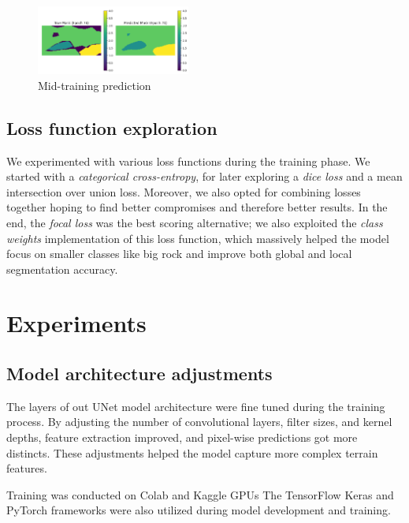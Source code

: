 \documentclass[11pt]{article}
\begin{document}
\begin{multicols}{2}
        \begin{figure}[H]
            \centering
            \includegraphics[width=0.45\textwidth]{reports/images/prediction1.png}
            \caption{\small Mid-training prediction}
        \end{figure}
        
        \subsection{Loss function exploration}
        
        We experimented with various loss functions during the training phase.
        We started with a \textit{categorical cross-entropy}, for later exploring a \textit{dice loss} and a {mean intersection over union loss}.
        Moreover, we also opted for combining losses together hoping to find better compromises and therefore better results.
        In the end, the \textit{focal loss} was the best scoring alternative; we also exploited the \textit{class weights} implementation of this loss function, which massively helped the model focus on smaller classes like {big rock} and improve both global and local segmentation accuracy.
        
        \section{Experiments}
        
        \subsection{Model architecture adjustments}
        
        The layers of out UNet model architecture were fine tuned during the training process.
        By adjusting the number of convolutional layers, filter sizes, and kernel depths, feature extraction improved, and pixel-wise predictions got more distincts.
        These adjustments helped the model capture more complex terrain features.

        Training was conducted on Colab\cite{colab2024} and Kaggle\cite{kaggle2024} GPUs
        The TensorFlow\cite{tensorflow2015} Keras\cite{keras2015} and PyTorch\cite{pytorch2019} frameworks were also utilized during model development and training.
        

\end{multicols}
\end{document}
